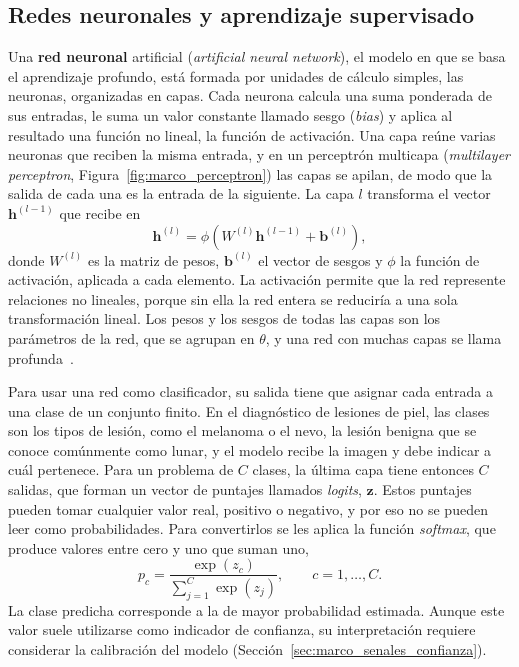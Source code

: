 \subsection{Redes neuronales y aprendizaje supervisado}
\label{sec:marco_redes}

Una \textbf{red neuronal} artificial (\emph{artificial neural network}), el modelo en que se basa el
aprendizaje profundo, está formada por unidades de cálculo simples, las neuronas, organizadas en capas. Cada neurona calcula una suma ponderada de sus entradas, le
suma un valor constante llamado sesgo (\emph{bias}) y aplica al resultado una función no lineal, la función de
activación. Una capa reúne varias neuronas que reciben la misma entrada, y en un perceptrón multicapa
(\emph{multilayer perceptron}, Figura~\ref{fig:marco_perceptron}) las capas se apilan, de modo que la salida de cada una es la entrada de la
siguiente. La capa $l$ transforma el vector $\mathbf{h}^{(l-1)}$ que recibe en
\begin{equation}
    \mathbf{h}^{(l)} = \phi\!\left(W^{(l)} \mathbf{h}^{(l-1)} + \mathbf{b}^{(l)}\right),
    \label{eq:marco_capa}
\end{equation}
donde $W^{(l)}$ es la matriz de pesos, $\mathbf{b}^{(l)}$ el vector de sesgos y $\phi$ la función de activación,
aplicada a cada elemento. La activación permite que la red represente relaciones no lineales, porque sin ella
la red entera se reduciría a una sola transformación lineal. Los pesos y los sesgos de todas las capas son los
parámetros de la red, que se agrupan en $\theta$, y una red con muchas capas se llama
profunda~\cite{goodfellow2016deep}.



Para usar una red como clasificador, su salida tiene que asignar cada entrada a una clase de un conjunto
finito. En el diagnóstico de lesiones de piel, las clases son los tipos de lesión, como el melanoma o el nevo, la
lesión benigna que se conoce comúnmente como lunar, y el modelo recibe la imagen y debe indicar a cuál
pertenece. Para un problema de $C$ clases, la última capa tiene entonces $C$ salidas, que
forman un vector de puntajes llamados \emph{logits}, $\mathbf{z}$. Estos puntajes pueden tomar cualquier valor
real, positivo o negativo, y por eso no se pueden leer como probabilidades. Para convertirlos se les aplica la
función \emph{softmax}, que produce valores entre cero y uno que suman uno,
\begin{equation}
    p_c = \frac{\exp(z_c)}{\sum_{j=1}^{C} \exp(z_j)}, \qquad c = 1, \dots, C.
    \label{eq:marco_softmax}
\end{equation}
La clase predicha corresponde a la de mayor probabilidad estimada. Aunque este valor suele utilizarse como indicador de confianza, su interpretación requiere considerar la calibración del modelo
(Sección~\ref{sec:marco_senales_confianza}).

